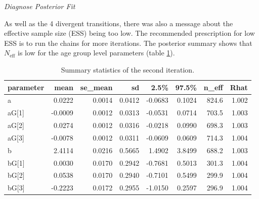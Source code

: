 \documentclass[11pt, oneside, openany]{scrbook}
\newenvironment{Shaded}{\begin{snugshade}}{\end{snugshade}}
\newcommand{\CommentTok}[1]{\textcolor[rgb]{0.56,0.35,0.01}{\textit{#1}}}
\newcommand{\KeywordTok}[1]{\textcolor[rgb]{0.13,0.29,0.53}{\textbf{#1}}}
\newcommand{\NormalTok}[1]{#1}
\begin{document}

\emph{Diagnose Posterior Fit}


\begin{Shaded}
\end{Shaded}


As well as the 4 divergent transitions, there was also a message about the effective sample size (ESS) being too low. The recommended prescription for low ESS is to run the chains for more iterations. The posterior summary shows that \(N_{\mathrm{eff}}\) is low for the age group level parameters (table \ref{tab:ch032-Liquid-Strawberry-Eagle}).

\begin{table}[!h]

\caption{\label{tab:ch032-Liquid-Strawberry-Eagle}Summary statistics of the second iteration.}
\centering
\begin{tabular}[t]{lrrrrrrr}
\toprule
parameter & mean & se\_mean & sd & 2.5\% & 97.5\% & n\_eff & Rhat\\
\midrule
a & 0.0222 & 0.0014 & 0.0412 & -0.0683 & 0.1024 & 824.6 & 1.002\\
aG[1] & -0.0009 & 0.0012 & 0.0313 & -0.0531 & 0.0714 & 703.5 & 1.003\\
aG[2] & 0.0274 & 0.0012 & 0.0316 & -0.0218 & 0.0990 & 698.3 & 1.003\\
aG[3] & -0.0078 & 0.0012 & 0.0311 & -0.0609 & 0.0609 & 714.3 & 1.004\\
b & 2.4114 & 0.0216 & 0.5665 & 1.4902 & 3.8499 & 688.2 & 1.003\\
\addlinespace
bG[1] & 0.0030 & 0.0170 & 0.2942 & -0.7681 & 0.5013 & 301.3 & 1.004\\
bG[2] & 0.0538 & 0.0170 & 0.2940 & -0.7101 & 0.5499 & 299.9 & 1.004\\
bG[3] & -0.2223 & 0.0172 & 0.2955 & -1.0150 & 0.2597 & 296.9 & 1.004\\
\bottomrule
\end{tabular}
\end{table}
\end{document}
